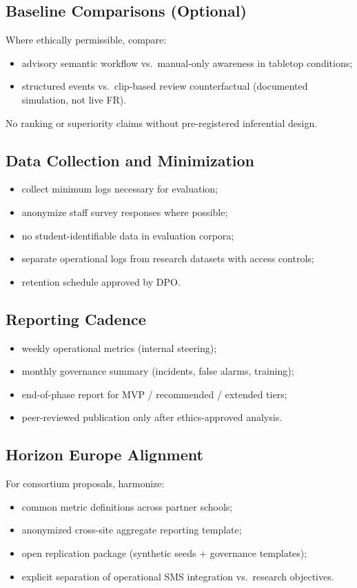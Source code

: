\subsection{Baseline Comparisons (Optional)}

Where ethically permissible, compare:
\begin{itemize}[noitemsep]
  \item advisory semantic workflow vs.\ manual-only awareness in tabletop conditions;
  \item structured events vs.\ clip-based review counterfactual (documented simulation, not live FR).
\end{itemize}

No ranking or superiority claims without pre-registered inferential design.

\subsection{Data Collection and Minimization}

\begin{itemize}[noitemsep]
  \item collect minimum logs necessary for evaluation;
  \item anonymize staff survey responses where possible;
  \item no student-identifiable data in evaluation corpora;
  \item separate operational logs from research datasets with access controls;
  \item retention schedule approved by DPO.
\end{itemize}

\subsection{Reporting Cadence}

\begin{itemize}[noitemsep]
  \item weekly operational metrics (internal steering);
  \item monthly governance summary (incidents, false alarms, training);
  \item end-of-phase report for MVP / recommended / extended tiers;
  \item peer-reviewed publication only after ethics-approved analysis.
\end{itemize}

\subsection{Horizon Europe Alignment}

For consortium proposals, harmonize:
\begin{itemize}[noitemsep]
  \item common metric definitions across partner schools;
  \item anonymized cross-site aggregate reporting template;
  \item open replication package (synthetic seeds + governance templates);
  \item explicit separation of operational SMS integration vs.\ research objectives.
\end{itemize}
